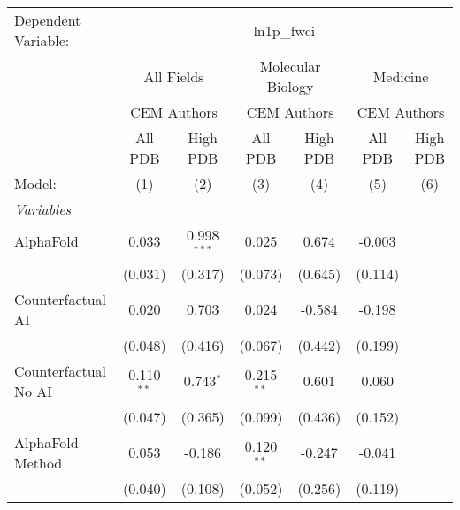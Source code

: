 \begingroup
\centering
\begin{tabular}{lcccccc}
   \tabularnewline \midrule \midrule
   Dependent Variable: & \multicolumn{6}{c}{ln1p\_fwci}\\
 & \multicolumn{2}{c}{All Fields} & \multicolumn{2}{c}{Molecular Biology} & \multicolumn{2}{c}{Medicine} \\
\cmidrule(lr){2-3} \cmidrule(lr){4-5} \cmidrule(lr){6-7}
 & \multicolumn{2}{c}{CEM Authors} & \multicolumn{2}{c}{CEM Authors} & \multicolumn{2}{c}{CEM Authors} \\
\cmidrule(lr){2-3} \cmidrule(lr){4-5} \cmidrule(lr){6-7}
 & \multicolumn{1}{c}{All PDB} & \multicolumn{1}{c}{High PDB} & \multicolumn{1}{c}{All PDB} & \multicolumn{1}{c}{High PDB} & \multicolumn{1}{c}{All PDB} & \multicolumn{1}{c}{High PDB} \\
\cmidrule(lr){2-2} \cmidrule(lr){3-3} \cmidrule(lr){4-4} \cmidrule(lr){5-5} \cmidrule(lr){6-6} \cmidrule(lr){7-7}
   Model:                                                     & (1)           & (2)           & (3)          & (4)     & (5)           & (6)\\  
   \midrule
   \emph{Variables}\\
   AlphaFold                                                  & 0.033         & 0.998$^{***}$ & 0.025        & 0.674   & -0.003        &   \\   
                                                              & (0.031)       & (0.317)       & (0.073)      & (0.645) & (0.114)       &   \\   
   Counterfactual AI                                          & 0.020         & 0.703         & 0.024        & -0.584  & -0.198        &   \\   
                                                              & (0.048)       & (0.416)       & (0.067)      & (0.442) & (0.199)       &   \\   
   Counterfactual No AI                                       & 0.110$^{**}$  & 0.743$^{*}$   & 0.215$^{**}$ & 0.601   & 0.060         &   \\   
                                                              & (0.047)       & (0.365)       & (0.099)      & (0.436) & (0.152)       &   \\   
   AlphaFold - Method                                         & 0.053         & -0.186        & 0.120$^{**}$ & -0.247  & -0.041        &   \\   
                                                              & (0.040)       & (0.108)       & (0.052)      & (0.256) & (0.119)       &   \\   

\end{tabular}
